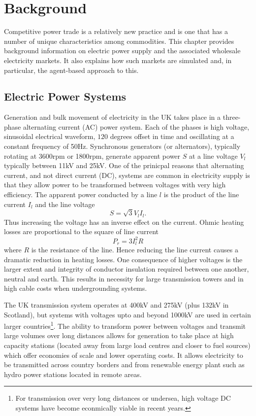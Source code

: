 \chapter{Background}
\label{ch:background}
Competitive power trade is a relatively new practice and is one that has a
number of unique characteristics among commodities.  This chapter provides
background information on electric power supply and the associated wholesale
electricity markets.  It also explains how such markets are simulated and, in
particular, the agent-based approach to this.

\section{Electric Power Systems}
Generation and bulk movement of electricity in the UK takes place in a
three-phase alternating current (AC) power system.  Each of the phases is
high voltage, sinusoidal electrical waveform, $120$ degrees offset in time
and oscillating at a constant frequency of 50Hz.  Synchronous generators (or
alternators), typically rotating at 3600rpm or 1800rpm, generate apparent power
$S$ at a line voltage $V_l$ typically between
11kV and 25kV.  One of the prinicpal reasons that alternating current, and not
direct current (DC), systems are common in electricity supply is that they
allow power to be transformed between voltages with very high efficiency.  The
apparent power conducted by a line $l$ is the product of the line current
$I_l$ and the line voltage
\begin{equation}
S = \sqrt{3} V_l I_l .
\end{equation}
Thus increasing the voltage has an inverse effect on the current.
Ohmic heating losses are proportional to the square of line current
\begin{equation}
P_{r} = 3 I_l^2 R
\end{equation}
where $R$ is the resistance of the line.  Hence reducing the line current
causes a dramatic reduction in heating losses.  One consequence of higher
voltages is the larger extent and integrity of conductor insulation required between
one another, neutral and earth.  This results in necessity for large
transmission towers and in high cable costs when undergrounding systems.

The UK transmission system operates at 400kV and 275kV (plus 132kV in
Scotland), but systems with voltages upto and beyond 1000kV are used in certain
larger countries\footnote{For transmission over very long distances or
undersea, high voltage DC systems have become econmically viable in recent
years.}.  The ability to transform power between voltages and transmit large
volumes over long distances allows for generation to take place at high
capacity stations (located away from large load centres and closer to fuel
sources) which offer economies of scale and lower operating costs.  It allows
electricity to be transmitted across country borders and from renewable
energy plant such as hydro power stations located in remote areas.

